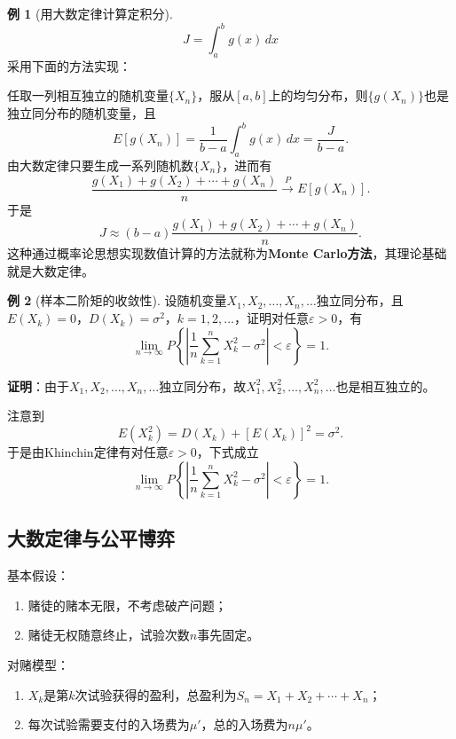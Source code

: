 \documentclass[11pt,a4paper]{report}
\theoremstyle{definition}
\newtheorem{example}{例}[chapter]
\begin{document}
\begin{example}[用大数定律计算定积分]
\[
J=\int_{a}^{b}g(x)\,dx
\]
采用下面的方法实现：

任取一列相互独立的随机变量$\{X_{n}\}$，服从$[a,b]$上的均匀分布，则$\{g(X_{n})\}$也是独立同分布的随机变量，且
\[
E[g(X_{n})]=\frac{1}{b-a}\int_{a}^{b}g(x)\,dx=\frac{J}{b-a}.
\]
由大数定律只要生成一系列随机数$\{X_{n}\}$，进而有
\[
\frac{g(X_{1})+g(X_{2})+\cdots+g(X_{n})}{n}\stackrel{P}{\to}E[g(X_{n})].
\]
于是
\[
J\approx(b-a)\frac{g(X_{1})+g(X_{2})+\cdots+g(X_{n})}{n}.
\]
这种通过概率论思想实现数值计算的方法就称为\textbf{Monte Carlo方法}，其理论基础就是大数定律。
\end{example}

\begin{example}[样本二阶矩的收敛性]
设随机变量$X_{1},X_{2},\ldots,X_{n},\ldots$独立同分布，且$E(X_{k})=0$，$D(X_{k})=\sigma^{2}$，$k=1,2,\ldots$，证明对任意$\varepsilon>0$，有
\[
\lim_{n\to\infty}P\left\{\left|\frac{1}{n}\sum_{k=1}^{n}X_{k}^{2}-\sigma^{2}\right|<\varepsilon\right\}=1.
\]
\end{example}

\textbf{证明}：由于$X_{1},X_{2},\ldots,X_{n},\ldots$独立同分布，故$X_{1}^{2},X_{2}^{2},\ldots,X_{n}^{2},\ldots$也是相互独立的。

注意到
\[
E(X_{k}^{2})=D(X_{k})+[E(X_{k})]^{2}=\sigma^{2}.
\]
于是由Khinchin定律有对任意$\varepsilon>0$，下式成立
\[
\lim_{n\to\infty}P\left\{\left|\frac{1}{n}\sum_{k=1}^{n}X_{k}^{2}-\sigma^{2}\right|<\varepsilon\right\}=1.
\]

\subsection{大数定律与公平博弈}

基本假设：
\begin{enumerate}[label=\arabic*.,leftmargin=2em]
    \item 赌徒的赌本无限，不考虑破产问题；
    \item 赌徒无权随意终止，试验次数$n$事先固定。
\end{enumerate}

对赌模型：
\begin{enumerate}[label=\arabic*.,leftmargin=2em]
    \item $X_{k}$是第$k$次试验获得的盈利，总盈利为$S_{n}=X_{1}+X_{2}+\cdots+X_{n}$；
    \item 每次试验需要支付的入场费为$\mu'$，总的入场费为$n\mu'$。
\end{enumerate}
\end{document}
